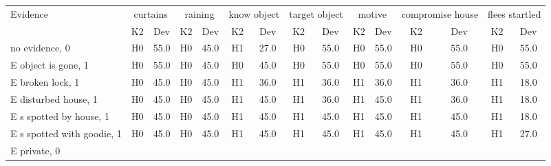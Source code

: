\begin{table}\begin{tabular}{l|cc|cc|cc|cc|cc|cc|cc}\toprule\multirow{2}{*}{Evidence} & \multicolumn{2}{c}{curtains}& \multicolumn{2}{c}{raining}& \multicolumn{2}{c}{know object}& \multicolumn{2}{c}{target object}& \multicolumn{2}{c}{motive}& \multicolumn{2}{c}{compromise house}& \multicolumn{2}{c}{flees startled}\\& {K2} & {Dev}& {K2} & {Dev}& {K2} & {Dev}& {K2} & {Dev}& {K2} & {Dev}& {K2} & {Dev}& {K2} & {Dev}\\\midrule
no evidence, 0 & \cellcolor{Bittersweet}H0&\cellcolor{Bittersweet}55.0&\cellcolor{Bittersweet}H0&\cellcolor{Bittersweet}45.0&\cellcolor{Bittersweet}H1&\cellcolor{Bittersweet}27.0&\cellcolor{Bittersweet}H0&\cellcolor{Bittersweet}55.0&\cellcolor{Bittersweet}H0&\cellcolor{Bittersweet}55.0&\cellcolor{Bittersweet}H0&\cellcolor{Bittersweet}55.0&\cellcolor{Bittersweet}H0&\cellcolor{Bittersweet}55.0\\E object is gone, 1 & \cellcolor{Bittersweet}H0&\cellcolor{Bittersweet}55.0&\cellcolor{Bittersweet}H0&\cellcolor{Bittersweet}45.0&\cellcolor{Bittersweet}H0&\cellcolor{Bittersweet}45.0&\cellcolor{Bittersweet}H0&\cellcolor{Bittersweet}55.0&\cellcolor{Bittersweet}H0&\cellcolor{Bittersweet}55.0&\cellcolor{Bittersweet}H0&\cellcolor{Bittersweet}55.0&\cellcolor{Bittersweet}H0&\cellcolor{Bittersweet}55.0\\E broken lock, 1 & \cellcolor{Bittersweet}H0&\cellcolor{Bittersweet}45.0&\cellcolor{Bittersweet}H0&\cellcolor{Bittersweet}45.0&\cellcolor{Bittersweet}H1&\cellcolor{Bittersweet}36.0&\cellcolor{Bittersweet}H1&\cellcolor{Bittersweet}36.0&\cellcolor{Bittersweet}H1&\cellcolor{Bittersweet}36.0&\cellcolor{Bittersweet}H1&\cellcolor{Bittersweet}36.0&\cellcolor{Bittersweet}H1&\cellcolor{Bittersweet}18.0\\E disturbed house, 1 & \cellcolor{Bittersweet}H0&\cellcolor{Bittersweet}45.0&\cellcolor{Bittersweet}H0&\cellcolor{Bittersweet}45.0&\cellcolor{Bittersweet}H1&\cellcolor{Bittersweet}45.0&\cellcolor{Bittersweet}H1&\cellcolor{Bittersweet}36.0&\cellcolor{Bittersweet}H1&\cellcolor{Bittersweet}45.0&\cellcolor{Bittersweet}H1&\cellcolor{Bittersweet}36.0&\cellcolor{Bittersweet}H1&\cellcolor{Bittersweet}18.0\\E s spotted by house, 1 & \cellcolor{Bittersweet}H0&\cellcolor{Bittersweet}45.0&\cellcolor{Bittersweet}H0&\cellcolor{Bittersweet}45.0&\cellcolor{Bittersweet}H1&\cellcolor{Bittersweet}45.0&\cellcolor{Bittersweet}H1&\cellcolor{Bittersweet}45.0&\cellcolor{Bittersweet}H1&\cellcolor{Bittersweet}45.0&\cellcolor{Bittersweet}H1&\cellcolor{Bittersweet}45.0&\cellcolor{Bittersweet}H1&\cellcolor{Bittersweet}18.0\\E s spotted with goodie, 1 & \cellcolor{Bittersweet}H0&\cellcolor{Bittersweet}45.0&\cellcolor{Bittersweet}H0&\cellcolor{Bittersweet}45.0&\cellcolor{Bittersweet}H1&\cellcolor{Bittersweet}45.0&\cellcolor{Bittersweet}H1&\cellcolor{Bittersweet}45.0&\cellcolor{Bittersweet}H1&\cellcolor{Bittersweet}45.0&\cellcolor{Bittersweet}H1&\cellcolor{Bittersweet}45.0&\cellcolor{Bittersweet}H1&\cellcolor{Bittersweet}27.0\\E private, 0 & 
\end{tabular}
\end{table}

